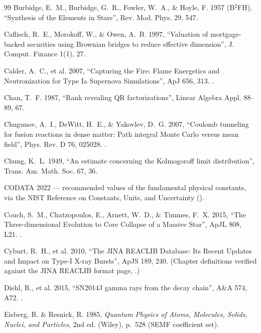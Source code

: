 \begin{thebibliography}{99}
Burbidge, E.~M., Burbidge, G.~R., Fowler, W.~A., \& Hoyle, F. 1957 (B$^2$FH),
``Synthesis of the Elements in Stars'', Rev. Mod. Phys. 29, 547.

Caflisch, R.~E., Morokoff, W., \& Owen, A.~B. 1997, ``Valuation of
mortgage-backed securities using Brownian bridges to reduce effective
dimension'', J. Comput. Finance 1(1), 27.

Calder, A.~C., et al. 2007, ``Capturing the Fire: Flame Energetics and
Neutronization for Type Ia Supernova Simulations'', ApJ 656, 313.
.

Chan, T.~F. 1987, ``Rank revealing QR factorizations'', Linear Algebra Appl.
88--89, 67.

Chugunov, A.~I., DeWitt, H.~E., \& Yakovlev, D.~G. 2007, ``Coulomb tunneling
for fusion reactions in dense matter: Path integral Monte Carlo versus mean
field'', Phys. Rev. D 76, 025028. .

Chung, K.~L. 1949, ``An estimate concerning the Kolmogoroff limit
distribution'', Trans. Am. Math. Soc. 67, 36.

CODATA 2022 --- recommended values of the fundamental physical constants, via
the NIST Reference on Constants, Units, and Uncertainty
().

Couch, S.~M., Chatzopoulos, E., Arnett, W.~D., \& Timmes, F.~X. 2015, ``The
Three-dimensional Evolution to Core Collapse of a Massive Star'', ApJL 808,
L21. .

Cyburt, R.~H., et al. 2010, ``The JINA REACLIB Database: Its Recent Updates
and Impact on Type-I X-ray Bursts'', ApJS 189, 240. (Chapter definitions
verified against the JINA REACLIB format page, .)

Diehl, R., et al. 2015, ``SN2014J gamma rays from the  decay
chain'', A\&A 574, A72. .

Eisberg, R. \& Resnick, R. 1985, \emph{Quantum Physics of Atoms, Molecules,
Solids, Nuclei, and Particles}, 2nd ed. (Wiley), p.~528 (SEMF coefficient
set).


\end{thebibliography}
